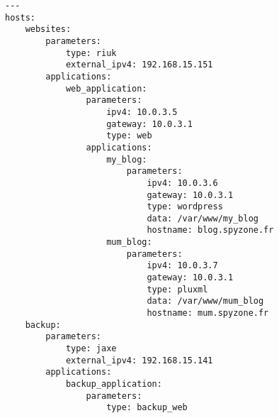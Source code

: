 \begin{lstlisting}[caption={runfile.yml}, label=fig_1.3_runfile]
---
hosts:
	websites:
		parameters:
			type: riuk
			external_ipv4: 192.168.15.151
		applications:
			web_application:
				parameters:
					ipv4: 10.0.3.5
					gateway: 10.0.3.1
					type: web
				applications:
					my_blog:
						parameters:
							ipv4: 10.0.3.6
							gateway: 10.0.3.1
							type: wordpress
							data: /var/www/my_blog
							hostname: blog.spyzone.fr
					mum_blog:
						parameters:
							ipv4: 10.0.3.7
							gateway: 10.0.3.1
							type: pluxml
							data: /var/www/mum_blog
							hostname: mum.spyzone.fr
	backup:
		parameters:
			type: jaxe
			external_ipv4: 192.168.15.141
		applications:
			backup_application:
				parameters:
					type: backup_web
\end{lstlisting}
